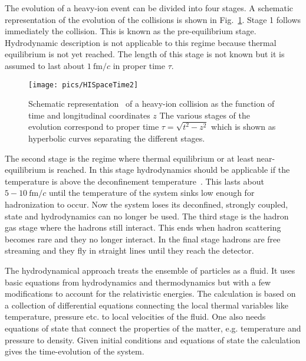 The evolution of a heavy-ion event can be divided into four stages. A schematic representation of the evolution of the collisions is shown in Fig.~\ref{fig:HISpaceTime}. Stage 1 follows immediately the collision. This is known as the pre-equilibrium stage. Hydrodynamic description is not applicable to this regime because thermal equilibrium is not yet reached. The length of this stage is not known but it is assumed to last about $1\ \mathrm{fm}/c$ in proper time $\tau$. 

\begin{figure}[htb]
\centering
               \texttt{[image: pics/HISpaceTime2]}
        \caption[Schematic representation of a heavy-ion collision]{Schematic representation~\cite{Romatschke:2009im} of a heavy-ion collision as the function of time and longitudinal coordinates $z$ The various stages of the evolution correspond to proper time $\tau=\sqrt{t^2-z^2}$ which is shown as hyperbolic curves separating the different stages.}
        	\label{fig:HISpaceTime}
\end{figure}

The second stage is the regime where thermal equilibrium or at least near-equilibrium is reached. In this stage hydrodynamics should be applicable if the temperature is above the deconfinement temperature~\cite{Romatschke:2009im}. This lasts about $5-10\ \mathrm{fm}/c$ until the temperature of the system sinks low enough for hadronization to occur. Now the system loses its deconfined, strongly coupled, state and hydrodynamics can no longer be used. The third stage is the hadron gas stage where the hadrons still interact. This ends when hadron scattering becomes rare and they no longer interact. In the final stage hadrons are free streaming and they fly in straight lines until they reach the detector.


The hydrodynamical approach treats the ensemble of particles as a fluid. It uses  basic equations from hydrodynamics and thermodynamics but with a few modifications to account for the relativistic energies. The calculation is based on a collection of differential equations connecting the local thermal variables like temperature, pressure etc. to local velocities of the fluid. One also needs equations of state that connect the properties of the matter, e.g. temperature and pressure to density.  Given initial conditions and equations of state the calculation gives the time-evolution of the system.

